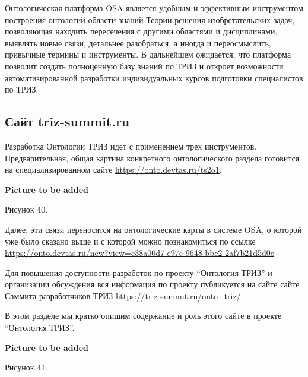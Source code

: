 \documentclass[11pt,a4paper]{article}
\newcommand{\addpicture}{\textbf{Picture to be added}\par}
\begin{document}
Онтологическая платформа OSA является удобным и эффективным инструментом
построения онтологий области знаний Теории решения изобретательских задач,
позволяющая находить пересечения с другими областями и дисциплинами, выявлять
новые связи, детальнее разобраться, а иногда и переосмыслить, привычные
термины и инструменты. В дальнейшем ожидается, что платформа позволит создать
полноценную базу знаний по ТРИЗ и откроет возможности автоматизированной
разработки индивидуальных курсов подготовки специалистов по ТРИЗ.

\subsection{Сайт triz-summit.ru}

Разработка Онтологии ТРИЗ идет с применением трех инструментов.
Предварительная, общая картина конкретного онтологического раздела готовится
на специализированном сайте \url{https://onto.devtas.ru/ts2o1}.
\begin{center}
  \addpicture
  Рисунок 40.
\end{center}
Далее, эти связи переносятся на онтологические карты в системе OSA, о которой
уже было сказано выше и с которой можно познакомиться по ссылке
\url{https://onto.devtas.ru/new?view=c38a00d7-e97c-9648-bbc2-2af7b21d5d0e}

Для повышения доступности разработок по проекту “Онтология ТРИЗ” и организации
обсуждения вся информация по проекту публикуется на сайте сайте Саммита
разработчиков ТРИЗ \url{https://triz-summit.ru/onto_triz/}.

В этом разделе мы кратко опишим содержание и роль этого сайте в проекте
“Онтология ТРИЗ”.
\begin{center}
  \addpicture
  Рисунок 41.
\end{center}
\end{document}
